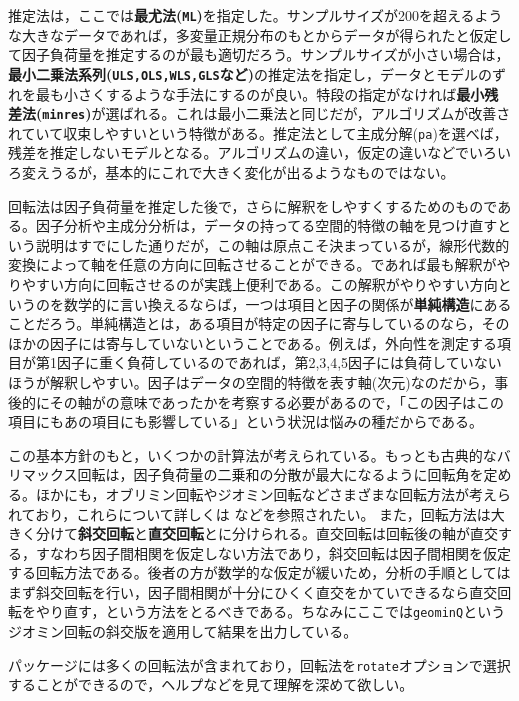 \documentclass[
  a4paper,
]{ltjsbook}
\begin{document}
推定法は，ここでは\textbf{最尤法(\texttt{ML})}を指定した。サンプルサイズが200を超えるような大きなデータであれば，多変量正規分布のもとからデータが得られたと仮定して因子負荷量を推定するのが最も適切だろう。サンプルサイズが小さい場合は，\textbf{最小二乗法系列(\texttt{ULS,OLS,WLS,GLS}など)}の推定法を指定し，データとモデルのずれを最も小さくするような手法にするのが良い。特段の指定がなければ\textbf{最小残差法(\texttt{minres})}が選ばれる。これは最小二乗法と同じだが，アルゴリズムが改善されていて収束しやすいという特徴がある。推定法として主成分解(\texttt{pa})を選べば，残差を推定しないモデルとなる。アルゴリズムの違い，仮定の違いなどでいろいろ変えうるが，基本的にこれで大きく変化が出るようなものではない。

回転法は因子負荷量を推定した後で，さらに解釈をしやすくするためのものである。因子分析や主成分分析は，データの持ってる空間的特徴の軸を見つけ直すという説明はすでにした通りだが，この軸は原点こそ決まっているが，線形代数的変換によって軸を任意の方向に回転させることができる。であれば最も解釈がやりやすい方向に回転させるのが実践上便利である。この解釈がやりやすい方向というのを数学的に言い換えるならば，一つは項目と因子の関係が\textbf{単純構造}にあることだろう。単純構造とは，ある項目が特定の因子に寄与しているのなら，そのほかの因子には寄与していないということである。例えば，外向性を測定する項目が第1因子に重く負荷しているのであれば，第2,3,4,5因子には負荷していないほうが解釈しやすい。因子はデータの空間的特徴を表す軸(次元)なのだから，事後的にその軸がの意味であったかを考察する必要があるので，「この因子はこの項目にもあの項目にも影響している」という状況は悩みの種だからである。

この基本方針のもと，いくつかの計算法が考えられている。もっとも古典的なバリマックス回転は，因子負荷量の二乗和の分散が最大になるように回転角を定める。ほかにも，オブリミン回転やジオミン回転などさまざまな回転方法が考えられており，これらについて詳しくは
\textcite{kosugi2018} などを参照されたい。
また，回転方法は大きく分けて\textbf{斜交回転}と\textbf{直交回転}とに分けられる。直交回転は回転後の軸が直交する，すなわち因子間相関を仮定しない方法であり，斜交回転は因子間相関を仮定する回転方法である。後者の方が数学的な仮定が緩いため，分析の手順としてはまず斜交回転を行い，因子間相関が十分にひくく直交をかていできるなら直交回転をやり直す，という方法をとるべきである。ちなみにここでは\texttt{geominQ}というジオミン回転の斜交版を適用して結果を出力している。

\textcite{GPArotation}
パッケージには多くの回転法が含まれており，回転法を\texttt{rotate}オプションで選択することができるので，ヘルプなどを見て理解を深めて欲しい。
\end{document}
